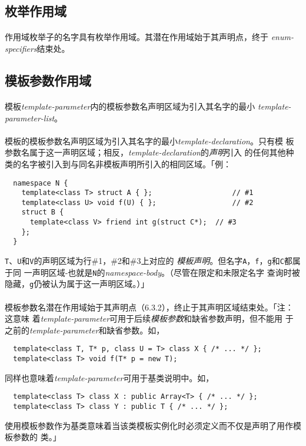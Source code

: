 \subsection{枚举作用域}
\paragraph{}
作用域枚举子的名字具有枚举作用域。其潜在作用域始于其声明点，终于
\textit{enum-specifiers}结束处。

\subsection{模板参数作用域}
\paragraph{}
模板\textit{template-parameter}内的模板参数名声明区域为引入其名字的最小
\textit{template-parameter-list}。

\paragraph{}
模板的模板参数名声明区域为引入其名字的最小\textit{template-declaration}。只有模
板参数名属于这一声明区域；相反，\textit{template-declaration}的\textit{声明}引入
的任何其他种类的名字被引入到与同名非模板声明所引入的相同区域。「例：
\begin{lstlisting}
  namespace N {
    template<class T> struct A { };                   // #1
    template<class U> void f(U) { };                  // #2
    struct B {
      template<class V> friend int g(struct C*);  // #3
    };
  }
\end{lstlisting}
\texttt{T}、\texttt{U}和\texttt{V}的声明区域为行\#1，\#2和\#3上对应的
\textit{模板声明}。但名字\texttt{A}，\texttt{f}，\texttt{g}和\texttt{C}都属于同
一声明区域-也就是\texttt{N}的\textit{namespace-body}。（尽管在限定和未限定名字
查询时被隐藏，\texttt{g}仍被认为属于这一声明区域。）」

\paragraph{}
模板参数名潜在作用域始于其声明点（6.3.2），终止于其声明区域结束处。「注：这意味
着\textit{template-parameter}可用于后续\textit{模板参数}和缺省参数声明，但不能用
于之前的\textit{template-parameter}和缺省参数。如，
\begin{lstlisting}
  template<class T, T* p, class U = T> class X { /* ... */ };
  template<class T> void f(T* p = new T);
\end{lstlisting}
同样也意味着\textit{template-parameter}可用于基类说明中。如，
\begin{lstlisting}
  template<class T> class X : public Array<T> { /* ... */ };
  template<class T> class Y : public T { /* ... */ };
\end{lstlisting}
使用模板参数作为基类意味着当该类模板实例化时必须定义而不仅是声明了用作模板参数的
类。」

